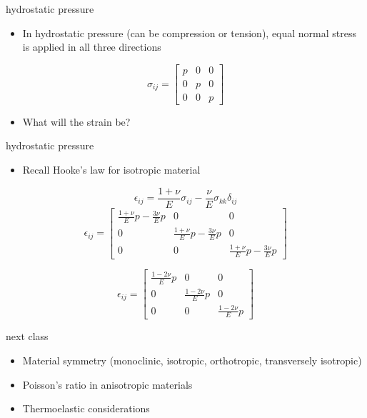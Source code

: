 \documentclass[
  letterpaper,
  ignorenonframetext,
  aspectratio=43,
  handout,
  12pt]{beamer}
\providecommand{\tightlist}{%
  \setlength{\itemsep}{0pt}\setlength{\parskip}{0pt}}
\providecommand{\tightlist}{%
\setlength{\itemsep}{0pt}\setlength{\parskip}{0pt}}
\begin{document}
\begin{frame}{hydrostatic pressure}
\protect\hypertarget{hydrostatic-pressure}{}
\begin{itemize}
\tightlist
\item
  In hydrostatic pressure (can be compression or tension), equal normal
  stress is applied in all three directions
\end{itemize}

\[\sigma_{ij} = \begin{bmatrix}
    p & 0 & 0 \\
    0 & p & 0\\
    0 & 0 & p
\end{bmatrix}\]

\begin{itemize}
\tightlist
\item
  What will the strain be?
\end{itemize}
\end{frame}

\begin{frame}{hydrostatic pressure}
\protect\hypertarget{hydrostatic-pressure-1}{}
\begin{itemize}
\tightlist
\item
  Recall Hooke's law for isotropic material
\end{itemize}

\[\epsilon_{ij} = \frac{1+\nu}{E}\sigma_{ij} - \frac{\nu}{E}\sigma_{kk} \delta_{ij}\]
\[\epsilon_{ij} = \begin{bmatrix}
    \frac{1+\nu}{E}p - \frac{3\nu}{E}p &0 &0\\
    0 & \frac{1+\nu}{E}p - \frac{3\nu}{E}p & 0\\
    0 & 0 & \frac{1+\nu}{E}p - \frac{3\nu}{E}p
\end{bmatrix}\]

\[\epsilon_{ij} = \begin{bmatrix}
    \frac{1-2\nu}{E}p &0 &0\\
    0 & \frac{1-2\nu}{E}p & 0\\
    0 & 0 & \frac{1-2\nu}{E}p
\end{bmatrix}\]
\end{frame}

\begin{frame}{next class}
\protect\hypertarget{next-class}{}
\begin{itemize}
\tightlist
\item
  Material symmetry (monoclinic, isotropic, orthotropic, transversely
  isotropic)
\item
  Poisson's ratio in anisotropic materials
\item
  Thermoelastic considerations
\end{itemize}
\end{frame}
\end{document}
